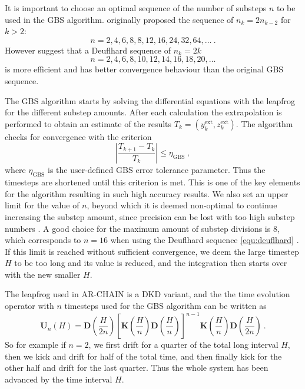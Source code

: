 \documentclass[english, oneside]{HYgradu}
\begin{document}
It is important to choose an optimal sequence of the number of substeps $n$ to be used in the GBS algorithm. \cite{bulirsch:1966} originally proposed the sequence of $n_k = 2n_{k-2}$ for $k > 2$:
\begin{equation}
n = 2,4,6,8,8,12,16,24,32,64, \ldots \ .
\end{equation}
However \cite{press:2007} suggest that a Deuflhard sequence of $n_k = 2k$
\begin{equation}
n = 2,4,6,8,10,12,14,16,18,20, \ldots \label{equ:deuflhard}
\end{equation}
is more efficient and has better convergence behaviour than the original GBS sequence. 

The GBS algorithm starts by solving the differential equations with the leapfrog for the different substep amounts. After each calculation the extrapolation is performed to obtain an estimate of the results $T_k = (y_k^{\mathrm{ext}}, z_k^{\mathrm{ext}})$. The algorithm checks for convergence with the criterion
\begin{equation}
\left| \frac{T_{k+1} - T_k}{T_k} \right| \leq \eta_{\mathrm{GBS}} \ ,
\end{equation}
where $\eta_{\mathrm{GBS}}$ is the user-defined GBS error tolerance parameter. Thus the timesteps are shortened until this criterion is met. This is one of the key elements for the algorithm resulting in such high accuracy results. We also set an upper limit for the value of $n$, beyond which it is deemed non-optimal to continue increasing the substep amount, since precision can be lost with too high substep numbers \citep{press:2007}. A good choice for the maximum amount of substep divisions is 8, which corresponds to $n = 16$ when using the Deuflhard sequence \eqref{equ:deuflhard} \citep{press:2007}. If this limit is reached without sufficient convergence, we deem the large timestep $H$ to be too long and its value is reduced, and the integration then starts over with the new smaller $H$.

The leapfrog used in AR-CHAIN is a DKD variant, and the the time evolution operator with $n$ timesteps used for the GBS algorithm can be written as
\begin{equation}
\mathbf{U}_n(H) = \mathbf{D} \left( \frac{H}{2n} \right) \left[ \mathbf{K} \left( \frac{H}{n} \right) \mathbf{D} \left( \frac{H}{n} \right) \right]^{n-1} \mathbf{K} \left( \frac{H}{n} \right) \mathbf{D} \left( \frac{H}{2n} \right) \ . \label{equ:GBSLeapfrog}
\end{equation}
So for example if $n=2$, we first drift for a quarter of the total long interval $H$, then we kick and drift for half of the total time, and then finally kick for the other half and drift for the last quarter. Thus the whole system has been advanced by the time interval $H$.
\end{document}
